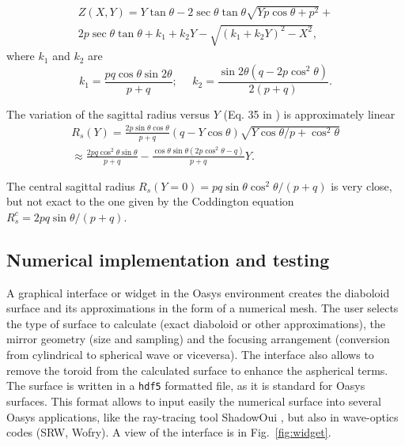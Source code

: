 \documentclass{iucr}              %
\begin{document}
\begin{multline}
\label{eqn:parabolicCone}
Z(X,Y) = Y \tan\theta - 2 \sec\theta \tan\theta
\sqrt{Y p \cos\theta + p^2} + \\
2 p \sec\theta \tan\theta +
k_1 + k_2 Y - \sqrt{(k_1 + k_2 Y)^2 - X^2},
\end{multline}
where $k_1$ and $k_2$ are
\begin{equation}
k_1 = \frac{p q \cos\theta \sin2\theta}{p+q};~~~~~~
k_2 = \frac{\sin2\theta(q-2p\cos^2\theta)}{2(p+q)}.
\end{equation}



The variation of the sagittal radius versus $Y$  (Eq. 35 in \cite{part2}) is approximately linear
\begin{multline}
\label{eq:sagRadius}
R_s(Y) = \frac{2  p \sin\theta \cos\theta}{p + q} (q - Y \cos\theta)   \sqrt{Y \cos\theta / p + \cos^2\theta} \\
\approx 
\frac{2p q \cos^2\theta \sin\theta  }{p + q} - 
\frac{\cos\theta \sin\theta (2 p \cos^2\theta - q)}{p + q} Y.
\end{multline}

The central sagittal radius $R_s(Y=0)=p q \sin\theta \cos^2\theta/ (p+q)$ is very close, but not exact to the one given by the Coddington equation $R_s^c=2 p q \sin\theta / (p+q)$.


\subsection{Numerical implementation and testing}
\label{sec:oasys}

A graphical interface or widget in the Oasys environment  creates the diaboloid surface and its approximations in the form of a numerical mesh. The user selects the type of surface to calculate (exact diaboloid or other approximations), the mirror geometry (size and sampling) and the focusing arrangement (conversion from cylindrical to spherical wave or viceversa). The interface also allows to remove the toroid from the calculated surface to enhance the aspherical terms. The surface is written in a {\tt hdf5} formatted file, as it is standard for Oasys surfaces. This format allows to input easily the numerical surface into several Oasys applications, like the ray-tracing tool ShadowOui \cite{codeSHADOWOUI}, but also in wave-optics codes (SRW, Wofry). A view of the interface is in Fig.~\ref{fig:widget}.
\end{document}
